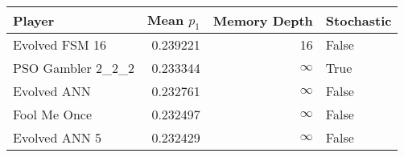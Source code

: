 \begin{tabular}{lrrl}
\toprule
            Player &  Mean $p_1$ &  Memory Depth & Stochastic \\
\midrule
    Evolved FSM 16 &    0.239221 &            16 &      False \\
 PSO Gambler 2\_2\_2 &    0.233344 &            \(\infty\) &       True \\
       Evolved ANN &    0.232761 &            \(\infty\) &      False \\
      Fool Me Once &    0.232497 &            \(\infty\) &      False \\
     Evolved ANN 5 &    0.232429 &            \(\infty\) &      False \\
\bottomrule
\end{tabular}
